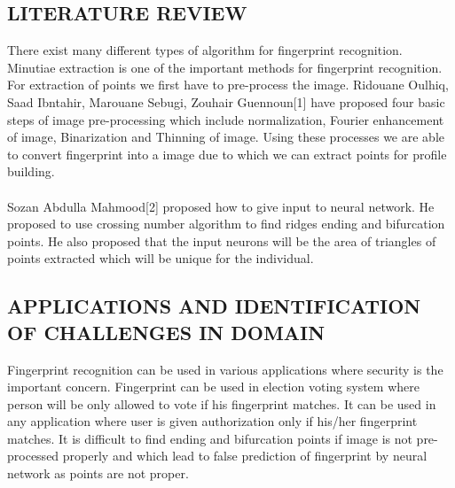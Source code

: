 \documentclass[a4paper, 12pt]{article}
\begin{document}
\subsection{LITERATURE REVIEW}
There exist many different types of algorithm for fingerprint recognition. Minutiae extraction is one of the important methods for fingerprint recognition. For extraction of points we first have to pre-process the image. Ridouane Oulhiq, Saad Ibntahir, Marouane Sebugi, Zouhair Guennoun[1] have proposed four basic steps of image pre-processing which include normalization, Fourier enhancement of image, Binarization and Thinning of image. Using these processes we are able to convert fingerprint into a image due to which we can extract points for profile building.\\\\
Sozan Abdulla Mahmood[2] proposed how to give input to neural network. He proposed to use crossing number algorithm to find ridges ending and bifurcation points. He also proposed that the input neurons will be the area of triangles of points extracted which will be unique for the individual.
\subsection{APPLICATIONS AND IDENTIFICATION OF CHALLENGES IN DOMAIN}
Fingerprint recognition can be used in various applications where security is the important concern. Fingerprint can be used in election voting system where person will be only allowed to vote if his fingerprint matches. It can be used in any application where user is given authorization only if his/her fingerprint matches. It is difficult to find ending and bifurcation points if image is not pre-processed properly and which lead to false prediction of fingerprint by neural network as points are not proper.
\end{document}
